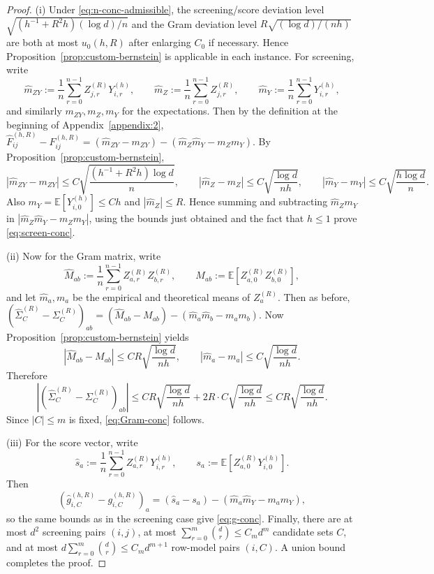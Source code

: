 \documentclass{article}
\newcommand{\E}{\mathbb{E}}
\begin{document}
\begin{proof}
(i) Under \eqref{eq:n-conc-admissible}, the screening/score deviation level $\sqrt{(h^{-1}+R^2 h)(\log d)/n}$ and the Gram deviation level $R\sqrt{(\log d)/(nh)}$ are both at most $u_0(h,R)$ after enlarging $C_0$ if necessary. Hence Proposition~\ref{prop:custom-bernstein} is applicable in each instance. For screening, write
\[
\hat m_{ZY}:=\frac1n\sum_{r=0}^{n-1} Z_{j,r}^{(R)}Y_{i,r}^{(h)},
\qquad
\hat m_Z:=\frac1n\sum_{r=0}^{n-1} Z_{j,r}^{(R)},
\qquad
\hat m_Y:=\frac1n\sum_{r=0}^{n-1} Y_{i,r}^{(h)},
\]
and similarly $m_{ZY},m_Z,m_Y$ for the expectations. Then by the definition at the beginning of Appendix~\ref{appendix:2}, $\widehat F_{ij}^{(h,R)}-F_{ij}^{(h,R)}
=(\hat m_{ZY}-m_{ZY})-(\hat m_Z\hat m_Y-m_Zm_Y)$. By Proposition~\ref{prop:custom-bernstein},
\[
|\hat m_{ZY}-m_{ZY}|\le C\sqrt{\frac{(h^{-1}+R^2 h)\log d}{n}},
\qquad
|\hat m_Z-m_Z|\le C\sqrt{\frac{\log d}{n h}},
\qquad
|\hat m_Y-m_Y|\le C\sqrt{\frac{h\log d}{n}}.
\]
Also $m_Y=\E[Y_{i,0}^{(h)}]\le Ch$ and $|\hat m_Z|\le R$. Hence summing and subtracting $\hat m _Zm_Y$ in $|\hat m_Z\hat m_Y-m_Zm_Y|$, using the bounds just obtained and the fact that $h\le1$ prove \eqref{eq:screen-conc}. 

(ii) Now for the Gram matrix, write
\[
\hat M_{ab}:=\frac1n\sum_{r=0}^{n-1} Z_{a,r}^{(R)}Z_{b,r}^{(R)},
\qquad M_{ab}:=\E[Z_{a,0}^{(R)}Z_{b,0}^{(R)}],
\]
and let $\hat m_a,m_a$ be the empirical and theoretical means of $Z_a^{(R)}$. Then as before, $(\widehat\Sigma_C^{(R)}-\Sigma_C^{(R)})_{ab}=(\hat M_{ab}-M_{ab})-(\hat m_a\hat m_b-m_am_b)$. Now Proposition~\ref{prop:custom-bernstein} yields
\[
|\hat M_{ab}-M_{ab}|\le C R\sqrt{\frac{\log d}{n h}},
\qquad
|\hat m_a-m_a|\le C\sqrt{\frac{\log d}{n h}}.
\]
Therefore
\[
|(\widehat\Sigma_C^{(R)}-\Sigma_C^{(R)})_{ab}|
\le C R\sqrt{\frac{\log d}{n h}} + 2R\cdot C\sqrt{\frac{\log d}{n h}}
\le C R\sqrt{\frac{\log d}{n h}}.
\]
Since $|C|\le m$ is fixed, \eqref{eq:Gram-conc} follows. 

(iii) For the score vector, write
\[
\hat s_a:=\frac1n\sum_{r=0}^{n-1} Z_{a,r}^{(R)}Y_{i,r}^{(h)},
\qquad
s_a:=\E[Z_{a,0}^{(R)}Y_{i,0}^{(h)}].
\]
Then
\[
(\widehat g_{i,C}^{(h,R)}-g_{i,C}^{(h,R)})_a=(\hat s_a-s_a)- (\hat m_a\hat m_Y-m_am_Y),
\]
so the same bounds as in the screening case give \eqref{eq:g-conc}. Finally, there are at most $d^2$ screening pairs $(i,j)$, at most $\sum_{r=0}^m\binom{d}{r}\le C_m d^m$ candidate sets $C$, and at most $d\sum_{r=0}^m\binom{d}{r}\le C_m d^{m+1}$ row-model pairs $(i,C)$. A union bound completes the proof.   
\end{proof}
\end{document}
